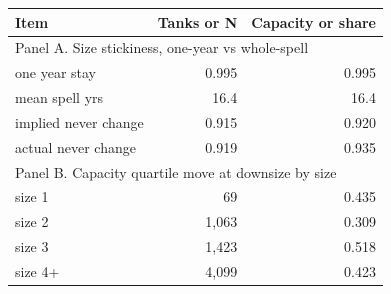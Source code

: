 \begin{tabular}{lrr}
\toprule
Item & Tanks or N & Capacity or share \\
\midrule
\multicolumn{3}{l}{Panel A. Size stickiness, one-year vs whole-spell} \\
\midrule
one year stay & 0.995 & 0.995 \\
mean spell yrs & 16.4 & 16.4 \\
implied never change & 0.915 & 0.920 \\
actual never change & 0.919 & 0.935 \\
\multicolumn{3}{l}{Panel B. Capacity quartile move at downsize by size} \\
\midrule
size 1 &    69 & 0.435 \\
size 2 & 1,063 & 0.309 \\
size 3 & 1,423 & 0.518 \\
size 4+ & 4,099 & 0.423 \\
\bottomrule
\end{tabular}
